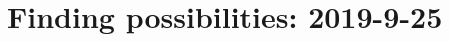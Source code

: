 \documentclass[../../main.tex]{subfiles}
\begin{document}
\section{\textbf{Finding possibilities}: 2019-9-25}
\end{document}
